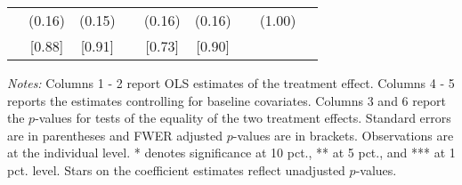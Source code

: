 \begin{table}[htbp]
{\begin{threeparttable}
\begin{tabular}{l*{8}{c}}
          &   (0.16)&   (0.15)&         &   (0.16)&   (0.16)&         &   (1.00)&         \\
          &   [0.88]&   [0.91]&         &   [0.73]&   [0.90]&         &         &         \\
\bottomrule \end{tabular} \begin{tablenotes}[flushleft] \footnotesize \item \emph{Notes:} Columns 1 - 2 report OLS estimates of the treatment effect. Columns 4 - 5 reports the estimates controlling for baseline covariates. Columns 3 and 6 report the \(p\)-values for tests of the equality of the two treatment effects. Standard errors are in parentheses and FWER adjusted \(p\)-values are in brackets. Observations are at the individual level. * denotes significance at 10 pct., ** at 5 pct., and *** at 1 pct. level. Stars on the coefficient estimates reflect unadjusted \(p\)-values. \end{tablenotes} \end{threeparttable} } \end{table}


